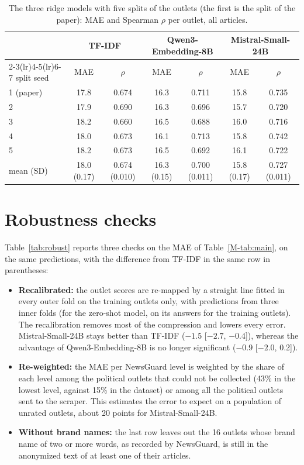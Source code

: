 \documentclass[11pt,a4paper]{article}
\begin{document}
\begin{table}[h]
\centering
\caption{The three ridge models with five splits of the outlets (the first is the split of the paper): MAE and
Spearman $\rho$ per outlet, all articles.}\label{tab:splits}
\small\setlength{\tabcolsep}{4pt}
\begin{tabular}{lcccccc}
\toprule
& \multicolumn{2}{c}{TF-IDF} & \multicolumn{2}{c}{Qwen3-Embedding-8B} & \multicolumn{2}{c}{Mistral-Small-24B} \\
\cmidrule(lr){2-3}\cmidrule(lr){4-5}\cmidrule(lr){6-7}
split seed & MAE & $\rho$ & MAE & $\rho$ & MAE & $\rho$ \\
\midrule
1 (paper) & 17.8 & 0.674 & 16.3 & 0.711 & 15.8 & 0.735 \\
2 & 17.9 & 0.690 & 16.3 & 0.696 & 15.7 & 0.720 \\
3 & 18.2 & 0.660 & 16.5 & 0.688 & 16.0 & 0.716 \\
4 & 18.0 & 0.673 & 16.1 & 0.713 & 15.8 & 0.742 \\
5 & 18.2 & 0.673 & 16.5 & 0.692 & 16.1 & 0.722 \\
\midrule
mean (SD) & 18.0 (0.17) & 0.674 (0.010) & 16.3 (0.15) & 0.700 (0.011) & 15.8 (0.17) & 0.727 (0.011) \\
\bottomrule
\end{tabular}
\end{table}

\section{Robustness checks}\label{app:robust}
Table~\ref{tab:robust} reports three checks on the MAE of Table~\ref{M-tab:main}, on the same predictions, with the
difference from TF-IDF in the same row in parentheses:
\begin{itemize}
  \item \textbf{Recalibrated:} the outlet scores are re-mapped by a straight line fitted in every outer fold on the
        training outlets only, with predictions from three inner folds (for the zero-shot model, on its answers for the
        training outlets). The recalibration removes most of the compression and lowers every error. Mistral-Small-24B
        stays better than TF-IDF ($-1.5$ [$-2.7$, $-0.4$]), whereas the advantage of Qwen3-Embedding-8B is no longer
        significant ($-0.9$ [$-2.0$, 0.2]).
  \item \textbf{Re-weighted:} the MAE per NewsGuard level is weighted by the share of each level among the political
        outlets that could not be collected (43\% in the lowest level, against 15\% in the dataset) or among all the
        political outlets sent to the scraper. This estimates the error to expect on a population of unrated outlets,
        about 20 points for Mistral-Small-24B.
  \item \textbf{Without brand names:} the last row leaves out the 16 outlets whose brand name of two or more words, as
        recorded by NewsGuard, is still in the anonymized text of at least one of their articles.
\end{itemize}
\end{document}
